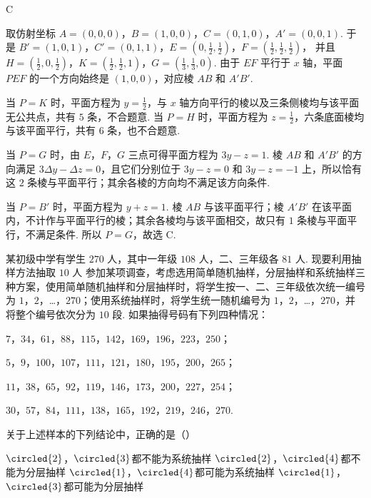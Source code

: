 \begin{answer}
C
\end{answer}

\begin{solution}
取仿射坐标 \(A=(0,0,0)\)，\(B=(1,0,0)\)，\(C=(0,1,0)\)，\(A'=(0,0,1)\).
于是 \(B'=(1,0,1)\)，\(C'=(0,1,1)\)，\(E=\left(0,\frac12,\frac12\right)\)，\(F=\left(\frac12,\frac12,\frac12\right)\)，
并且 \(H=\left(\frac12,0,\frac12\right)\)，\(K=\left(\frac12,\frac12,1\right)\)，\(G=\left(\frac13,\frac13,0\right)\). 由于 \(EF\) 平行于 \(x\) 轴，平面 \(PEF\) 的一个方向始终是 \((1,0,0)\)，对应棱 \(AB\) 和 \(A'B'\).

当 \(P=K\) 时，平面方程为 \(y=\frac12\)，与 \(x\) 轴方向平行的棱以及三条侧棱均与该平面无公共点，共有 \(5\) 条，不合题意. 当 \(P=H\) 时，平面方程为 \(z=\frac12\)，六条底面棱均与该平面平行，共有 \(6\) 条，也不合题意.

当 \(P=G\) 时，由 \(E\)，\(F\)，\(G\) 三点可得平面方程为 \(3y-z=1\). 棱 \(AB\) 和 \(A'B'\) 的方向满足 \(3\Delta y-\Delta z=0\)，且它们分别位于 \(3y-z=0\) 和 \(3y-z=-1\) 上，所以恰有这 \(2\) 条棱与平面平行；其余各棱的方向均不满足该方向条件.

当 \(P=B'\) 时，平面方程为 \(y+z=1\). 棱 \(AB\) 与该平面平行；棱 \(A'B'\) 在该平面内，不计作与平面平行的棱；其余各棱均与该平面相交，故只有 \(1\) 条棱与平面平行，不满足条件. 所以 \(P=G\)，故选 C.
\end{solution}

\begin{problem}
某初级中学有学生 \(270\text{ 人}\)，其中一年级 \(108\text{ 人}\)，二、三年级各 \(81\text{ 人}\). 现要利用抽样方法抽取 \(10\text{ 人}\) 参加某项调查，考虑选用简单随机抽样，分层抽样和系统抽样三种方案，使用简单随机抽样和分层抽样时，将学生按一、二、三年级依次统一编号为 \(1\)，\(2\)，…，\(270\)；使用系统抽样时，将学生统一随机编号为 \(1\)，\(2\)，…，\(270\)，并将整个编号依次分为 \(10\) 段. 如果抽得号码有下列四种情况：

\begin{circlelist}
\item \(7\)，\(34\)，\(61\)，\(88\)，\(115\)，\(142\)，\(169\)，\(196\)，\(223\)，\(250\)；
\item \(5\)，\(9\)，\(100\)，\(107\)，\(111\)，\(121\)，\(180\)，\(195\)，\(200\)，\(265\)；
\item \(11\)，\(38\)，\(65\)，\(92\)，\(119\)，\(146\)，\(173\)，\(200\)，\(227\)，\(254\)；
\item \(30\)，\(57\)，\(84\)，\(111\)，\(138\)，\(165\)，\(192\)，\(219\)，\(246\)，\(270\).
\end{circlelist}

关于上述样本的下列结论中，正确的是（\quad）

\choices
    {\(\circled{2}\)，\(\circled{3}\)都不能为系统抽样}
    {\(\circled{2}\)，\(\circled{4}\)都不能为分层抽样}
    {\(\circled{1}\)，\(\circled{4}\)都可能为系统抽样}
    {\(\circled{1}\)，\(\circled{3}\)都可能为分层抽样}
\end{problem}


